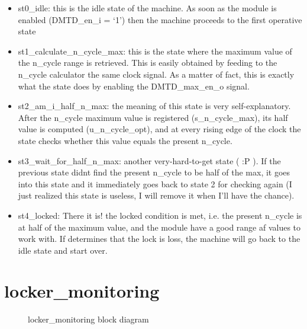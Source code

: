 \documentclass[letterpaper,10pt,english,openany,oneside]{sphinxmanual}
\begin{document}
\begin{itemize}
\item {} 
st0\_idle: this is the idle state of the machine. As soon as the module is enabled (DMTD\_en\_i = ‘1’) then the machine proceeds to the first operative state

\item {} 
st1\_calculate\_n\_cycle\_max: this is the state where the maximum value of the n\_cycle range is retrieved. This is easily obtained by feeding to the n\_cycle calculator the same clock signal. As a matter of fact, this is exactly what the state does by enabling the DMTD\_max\_en\_o signal.

\item {} 
st2\_am\_i\_half\_n\_max: the meaning of this state is very self-explanatory. After the n\_cycle maximum value is registered (s\_n\_cycle\_max), its half value is computed (u\_n\_cycle\_opt), and at every rising edge of the clock the state checks whether this value equals the present n\_cycle.

\item {} 
st3\_wait\_for\_half\_n\_max: another very-hard-to-get state ( :P ). If the previous state didnt find the present n\_cycle to be half of the max, it goes into this state and it immediately goes back to state 2 for checking again (I just realized this state is useless, I will remove it when I’ll have the chance).

\item {} 
st4\_locked: There it is! the locked condition is met, i.e. the present n\_cycle is at half of the maximum value, and the {\hyperref[\detokenize{code_explanation/phase_detector:locker-monitoring-ref}]{}} module have a good range af values to work with. If {\hyperref[\detokenize{code_explanation/phase_detector:locker-monitoring-ref}]{}} determines that the lock is loss, the machine will go back to the idle state and start over.

\end{itemize}


\section{locker\_monitoring}
\label{\detokenize{code_explanation/phase_detector:locker-monitoring}}\label{\detokenize{code_explanation/phase_detector:locker-monitoring-ref}}
\begin{figure}[htbp]
\centering
\capstart

\noindent{}
\caption{locker\_monitoring block diagram}\label{\detokenize{code_explanation/phase_detector:id3}}\end{figure}
\end{document}

